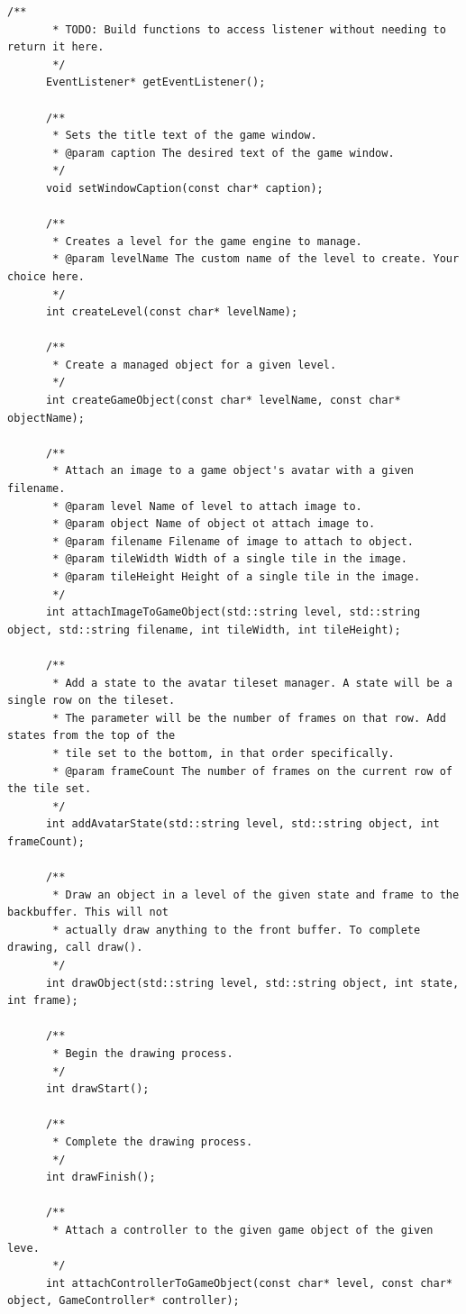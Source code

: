\documentclass[12pt]{article}
\begin{document}
\begin{lstlisting}[breaklines]
      /**
       * TODO: Build functions to access listener without needing to return it here.
       */
      EventListener* getEventListener();

      /**
       * Sets the title text of the game window.
       * @param caption The desired text of the game window.
       */
      void setWindowCaption(const char* caption);
      
      /**
       * Creates a level for the game engine to manage.
       * @param levelName The custom name of the level to create. Your choice here.
       */
      int createLevel(const char* levelName);
      
      /**
       * Create a managed object for a given level.
       */
      int createGameObject(const char* levelName, const char* objectName);
      
      /**
       * Attach an image to a game object's avatar with a given filename.
       * @param level Name of level to attach image to.
       * @param object Name of object ot attach image to.
       * @param filename Filename of image to attach to object.
       * @param tileWidth Width of a single tile in the image.
       * @param tileHeight Height of a single tile in the image.
       */
      int attachImageToGameObject(std::string level, std::string object, std::string filename, int tileWidth, int tileHeight);
      
      /**
       * Add a state to the avatar tileset manager. A state will be a single row on the tileset.
       * The parameter will be the number of frames on that row. Add states from the top of the
       * tile set to the bottom, in that order specifically.
       * @param frameCount The number of frames on the current row of the tile set.
       */
      int addAvatarState(std::string level, std::string object, int frameCount);
      
      /**
       * Draw an object in a level of the given state and frame to the backbuffer. This will not
       * actually draw anything to the front buffer. To complete drawing, call draw().
       */
      int drawObject(std::string level, std::string object, int state, int frame);
      
      /**
       * Begin the drawing process.
       */
      int drawStart();
      
      /**
       * Complete the drawing process.
       */
      int drawFinish();
      
      /**
       * Attach a controller to the given game object of the given leve.
       */
      int attachControllerToGameObject(const char* level, const char* object, GameController* controller);
      

\end{lstlisting}
\end{document}
